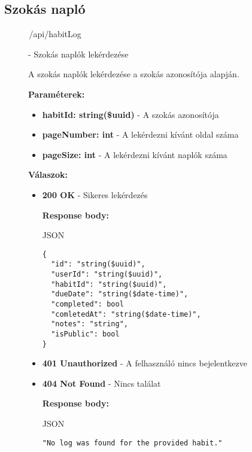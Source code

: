 \documentclass[12pt]{report}
\newcommand{\httpGet}[1]{\colorbox{getColor}{\textbf{\textcolor{white}{GET}}}~#1}
\begin{document}
\begin{itemize}
\subsection{Szokás napló}
\begin{description}
  \item[\httpGet{/api/habitLog}] - Szokás naplók lekérdezése
  
    \vspace{0.5cm}
    A szokás naplók lekérdezése a szokás azonosítója alapján.

    \vspace{0.5cm}
    \textbf{Paraméterek:}
    \begin{itemize}
      \item \textbf{habitId: string(\$uuid)} - A szokás azonosítója
      \item \textbf{pageNumber: int} - A lekérdezni kívánt oldal száma
      \item \textbf{pageSize: int} - A lekérdezni kívánt naplók száma
    \end{itemize}

    \vspace{0.5cm}
    \textbf{Válaszok:}
    \begin{itemize}
      \item \textbf{200 OK} - Sikeres lekérdezés

        \textbf{Response body:}
        \begin{codeblock}{JSON}
          \begin{verbatim}
{
  "id": "string($uuid)",
  "userId": "string($uuid)",
  "habitId": "string($uuid)",
  "dueDate": "string($date-time)",
  "completed": bool
  "comletedAt": "string($date-time)",
  "notes": "string",
  "isPublic": bool
}
          \end{verbatim}
        \end{codeblock}

      \item \textbf{401 Unauthorized} - A felhasználó nincs bejelentkezve

      \item \textbf{404 Not Found} - Nincs találat
      
        \textbf{Response body:}
        \begin{codeblock}{JSON}
          \begin{verbatim}
"No log was found for the provided habit."
          \end{verbatim}
        \end{codeblock}
    \end{itemize}


\end{description}
\end{itemize}
\end{document}
